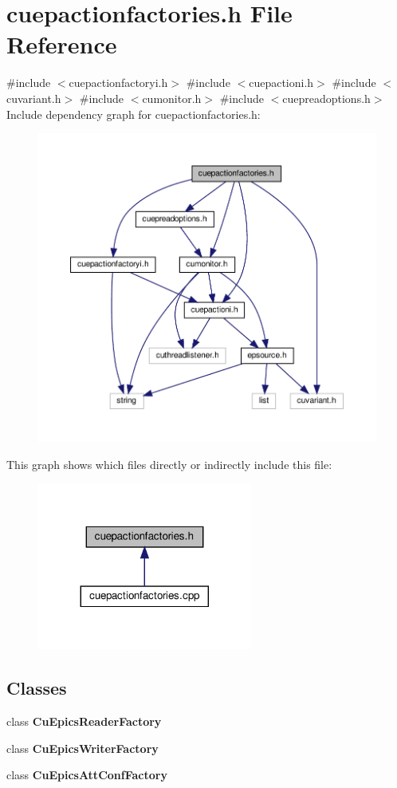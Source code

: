 \section{cuepactionfactories.\+h File Reference}
\label{cuepactionfactories_8h}
{\ttfamily \#include $<$cuepactionfactoryi.\+h$>$}\newline
{\ttfamily \#include $<$cuepactioni.\+h$>$}\newline
{\ttfamily \#include $<$cuvariant.\+h$>$}\newline
{\ttfamily \#include $<$cumonitor.\+h$>$}\newline
{\ttfamily \#include $<$cuepreadoptions.\+h$>$}\newline
Include dependency graph for cuepactionfactories.\+h\+:\nopagebreak
\begin{figure}[H]
\begin{center}
\leavevmode
\includegraphics[width=350pt]{cuepactionfactories_8h__incl}
\end{center}
\end{figure}
This graph shows which files directly or indirectly include this file\+:\nopagebreak
\begin{figure}[H]
\begin{center}
\leavevmode
\includegraphics[width=200pt]{cuepactionfactories_8h__dep__incl}
\end{center}
\end{figure}
\subsection*{Classes}
\begin{DoxyCompactItemize}
\item 
class \textbf{ Cu\+Epics\+Reader\+Factory}
\item 
class \textbf{ Cu\+Epics\+Writer\+Factory}
\item 
class \textbf{ Cu\+Epics\+Att\+Conf\+Factory}
\end{DoxyCompactItemize}
